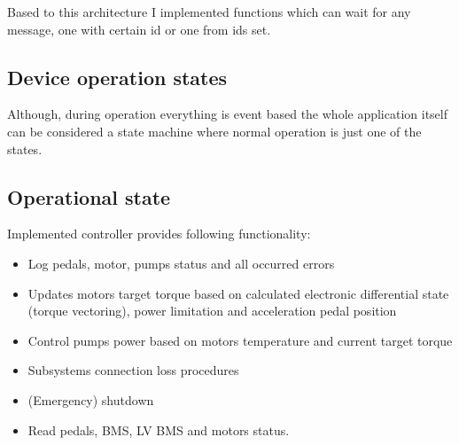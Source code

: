 Based to this architecture I implemented functions which can wait for any message, one with certain id or one from ids set.

\subsection{Device operation states}
Although, during operation everything is event based the whole application itself can be considered a state machine where normal operation is just one of the states.


\subsection{Operational state}
Implemented controller provides following functionality:
\begin{itemize}
    \item Log pedals, motor, pumps status and all occurred errors
    \item Updates motors target torque based on calculated electronic differential state (torque vectoring), power limitation and acceleration pedal position
    \item Control pumps power based on motors temperature and current target torque
    \item Subsystems connection loss procedures
    \item (Emergency) shutdown
    \item Read pedals, BMS, LV BMS and motors status.
\end{itemize}